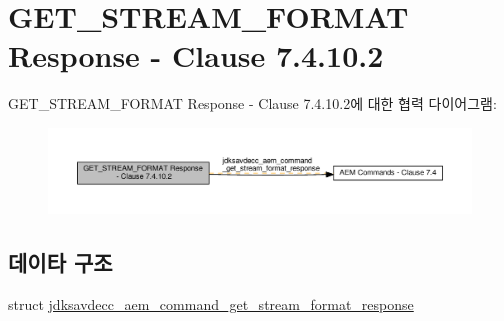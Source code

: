 \hypertarget{group__command__get__stream__format__response}{}\section{G\+E\+T\+\_\+\+S\+T\+R\+E\+A\+M\+\_\+\+F\+O\+R\+M\+AT Response -\/ Clause 7.4.10.2}
\label{group__command__get__stream__format__response}
G\+E\+T\+\_\+\+S\+T\+R\+E\+A\+M\+\_\+\+F\+O\+R\+M\+AT Response -\/ Clause 7.4.10.2에 대한 협력 다이어그램\+:
\nopagebreak
\begin{figure}[H]
\begin{center}
\leavevmode
\includegraphics[width=350pt]{group__command__get__stream__format__response}
\end{center}
\end{figure}
\subsection*{데이타 구조}
\begin{DoxyCompactItemize}
\item 
struct \hyperlink{structjdksavdecc__aem__command__get__stream__format__response}{jdksavdecc\+\_\+aem\+\_\+command\+\_\+get\+\_\+stream\+\_\+format\+\_\+response}
\end{DoxyCompactItemize}
